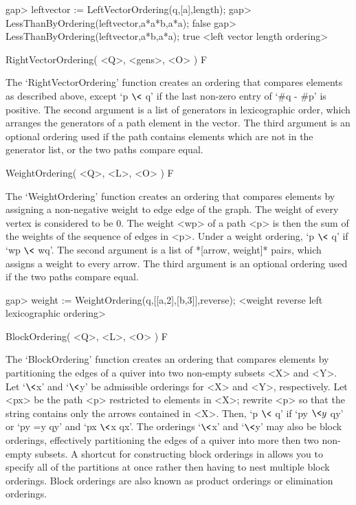 \beginexample
gap> leftvector := LeftVectorOrdering(q,[a],length);
gap> LessThanByOrdering(leftvector,a*a*b,a*a);
false
gap> LessThanByOrdering(leftvector,a*b,a*a);
true
<left vector length ordering>

\endexample

\>RightVectorOrdering( <Q>, <gens>, <O> ) F

The `RightVectorOrdering' function creates an ordering that compares elements
as described above, except `p $\<$ q' if the last non-zero entry of
`\#q - \#p' is positive.  The second argument is a list of generators in
lexicographic order, which arranges the generators of a path element in the
vector.  The third argument is an optional ordering used if the path contains
elements which are not in the generator list, or the two paths compare equal.

\>WeightOrdering( <Q>, <L>, <O> ) F

The `WeightOrdering' function creates an ordering that compares elements
by assigning a non-negative weight to edge edge of the graph.  The weight
of every vertex is considered to be 0.  The weight <wp> of a path <p> is then
the sum of the weights of the sequence of edges in <p>.  Under a weight
ordering, `p $\<$ q' if `wp $\<$ wq'.  The second argument is a list of
*[arrow, weight]* pairs, which assigns a weight to every arrow.  The third
argument is an optional ordering used if the two paths compare equal.

\beginexample
gap> weight := WeightOrdering(q,[[a,2],[b,3]],reverse);
<weight reverse left lexicographic ordering>
\endexample

\>BlockOrdering( <Q>, <L>, <O> ) F

The `BlockOrdering' function creates an ordering that compares elements by
partitioning the edges of a quiver into two non-empty subsets <X> and <Y>.
Let `$\<$x' and `$\<$y' be admissible orderings for <X> and <Y>,
respectively.  Let <px> be the path <p> restricted to elements in <X>;
rewrite <p> so that the string contains only the arrows contained in <X>.
Then, `p $\<$ q' if `py $\<y$ qy' or `py =y qy' and `px $\<$x qx'.  The
orderings `$\<$x' and `$\<$y' may also be block orderings, effectively
partitioning the edges of a quiver into more then two non-empty subsets.
A shortcut for constructing block orderings in {\QPA} allows you to specify
all of the partitions at once rather then having to nest multiple block
orderings.  Block orderings are also known as product orderings or
elimination orderings.

